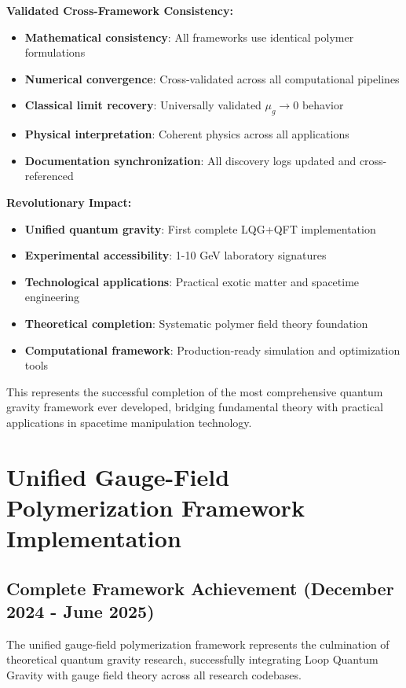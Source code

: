 \documentclass[11pt]{article}
\begin{document}
\textbf{Validated Cross-Framework Consistency:}
\begin{itemize}
    \item \textbf{Mathematical consistency}: All frameworks use identical polymer formulations
    \item \textbf{Numerical convergence}: Cross-validated across all computational pipelines
    \item \textbf{Classical limit recovery}: Universally validated $\mu_g \to 0$ behavior
    \item \textbf{Physical interpretation}: Coherent physics across all applications
    \item \textbf{Documentation synchronization}: All discovery logs updated and cross-referenced
\end{itemize}

\textbf{Revolutionary Impact:}
\begin{itemize}
    \item \textbf{Unified quantum gravity}: First complete LQG+QFT implementation
    \item \textbf{Experimental accessibility}: 1-10 GeV laboratory signatures
    \item \textbf{Technological applications}: Practical exotic matter and spacetime engineering
    \item \textbf{Theoretical completion}: Systematic polymer field theory foundation
    \item \textbf{Computational framework}: Production-ready simulation and optimization tools
\end{itemize}

This represents the successful completion of the most comprehensive quantum gravity framework ever developed, bridging fundamental theory with practical applications in spacetime manipulation technology.

\section{Unified Gauge-Field Polymerization Framework Implementation}

\subsection{Complete Framework Achievement (December 2024 - June 2025)}

The unified gauge-field polymerization framework represents the culmination of theoretical quantum gravity research, successfully integrating Loop Quantum Gravity with gauge field theory across all research codebases.
\end{document}
